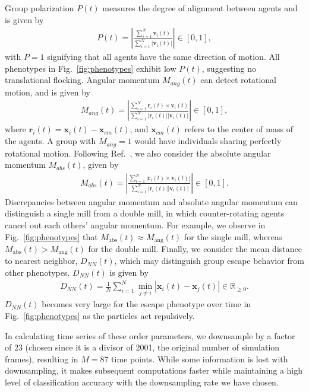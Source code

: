 \documentclass[%
 aip,
reprint,
 amsmath,amssymb,
 aps,
showkeys
]{revtex4-1}
\begin{document}
Group polarization $P(t)$ measures the degree of alignment between agents and is given by
\begin{align}
P(t) = \left| \frac{\sum_{i=1}^N \textbf{v}_i(t)}{\sum_{i=1}^N |\textbf{v}_i(t)|} \right| \in [0,1],
\end{align}
with $P=1$ signifying that all agents have the same direction of motion. All phenotypes in Fig.~\ref{fig:phenotypes} exhibit low $P(t)$, suggesting no translational flocking.
Angular momentum $M_{ang}(t)$ can detect rotational motion, and is given by
\begin{align}
M_{ang}(t) = \left| \frac{\sum_{i=1}^N \textbf{r}_i(t) \times\textbf{v}_i(t)}{\sum_{i=1}^N |\textbf{r}_i(t)| |\textbf{v}_i(t)|} \right|  \in [0,1],
\end{align}
where $\textbf{r}_i(t) = \textbf{x}_i(t) - \textbf{x}_{cm}(t)$, and $\textbf{x}_{cm}(t)$ refers to the center of mass of the agents. A group with $M_{ang}=1$ would have individuals sharing perfectly rotational motion. Following Ref.~, we also consider the absolute angular momentum $M_{abs}(t)$, given by
\begin{align}
M_{abs}(t) = \left| \frac{\sum_{i=1}^N | \textbf{r}_i(t) \times\textbf{v}_i(t) |}{\sum_{i=1}^N |\textbf{r}_i(t)| |\textbf{v}_i(t)|} \right|  \in [0,1].
\end{align}
 Discrepancies between angular momentum and absolute angular momentum can distinguish a single mill from a double mill, in which counter-rotating agents cancel out each others' angular momentum. For example, we observe in Fig.~\ref{fig:phenotypes}  that $M_{\text{abs}}(t)\approx M_{\text{ang}}(t)$ for the single mill, whereas $M_{\text{abs}}(t) > M_{\text{ang}}(t)$ for the double mill.  Finally, we consider the mean distance to nearest neighbor, $D_{NN}(t)$, which may distinguish group escape behavior from other phenotypes. \cite{Huepe2008} $D_{NN}(t)$ is given by
\begin{align*}
D_{NN}(t) = \frac{1}{N}\displaystyle\sum_{i=1}^N \min_{j\neq i} |\textbf{x}_i(t) - \textbf{x}_j(t)| \in \mathbb{R}_{\geq 0}.
\end{align*}
 $D_{NN}(t)$ becomes very large for the escape phenotype over time in Fig.~\ref{fig:phenotypes} as the particles act repulsively.

In calculating time series of these order parameters, we downsample by a factor of 23 (chosen since it is a divisor of 2001, the original number of simulation frames), resulting in $M=87$ time points. While some information is lost with downsampling, it makes subsequent computations faster while maintaining a high level of classification accuracy with the downsampling rate we have chosen.
\end{document}
